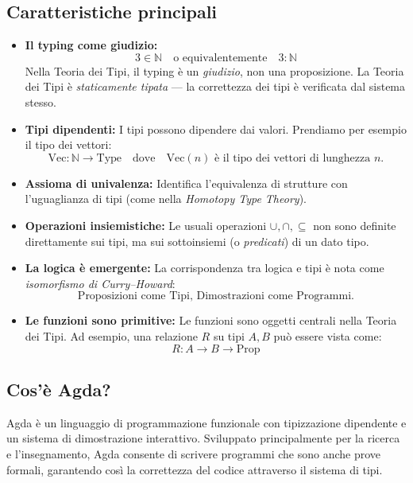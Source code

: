 \documentclass[a4paper]{article}
\theoremstyle{definition}
\theoremstyle{remark}
\begin{document}
\subsection*{Caratteristiche principali}

\begin{itemize}[leftmargin=2em]
  \item \textbf{Il typing come giudizio:}
    \[
      3 \in \mathbb{N} \quad \text{o equivalentemente} \quad 3 : \mathbb{N}
    \]
    Nella Teoria dei Tipi, il typing è un \emph{giudizio}, non una proposizione.  
    La Teoria dei Tipi è \emph{staticamente tipata} — la correttezza dei tipi è verificata dal sistema stesso.

  \item \textbf{Tipi dipendenti:}  
    I tipi possono dipendere dai valori. 
    Prendiamo per esempio il tipo dei vettori:
    \[
      \text{Vec} : \mathbb{N} \to \text{Type} \quad \text{dove} \quad \text{Vec}(n) \text{ è il tipo dei vettori di lunghezza } n.
    \]


  \item \textbf{Assioma di univalenza:}  
    Identifica l’equivalenza di strutture con l’uguaglianza di tipi (come nella \emph{Homotopy Type Theory}).

  \item \textbf{Operazioni insiemistiche:}  
    Le usuali operazioni \(\cup, \cap, \subseteq\) non sono definite direttamente sui tipi,  
    ma sui sottoinsiemi (o \emph{predicati}) di un dato tipo.

  \item \textbf{La logica è emergente:}  
    La corrispondenza tra logica e tipi è nota come \emph{isomorfismo di Curry–Howard}:  
    \[
      \text{Proposizioni come Tipi, Dimostrazioni come Programmi.}
    \]

  \item \textbf{Le funzioni sono primitive:}  
    Le funzioni sono oggetti centrali nella Teoria dei Tipi.  
    Ad esempio, una relazione \( R \) su tipi \( A, B \) può essere vista come:
    \[
      R : A \to B \to \text{Prop}
    \]
\end{itemize}

\subsection{Cos'è Agda?}

Agda è un linguaggio di programmazione funzionale con tipizzazione dipendente
e un sistema di dimostrazione interattivo. 
Sviluppato principalmente per la ricerca e l'insegnamento,
Agda consente di scrivere programmi che sono anche prove formali,
garantendo così la correttezza del codice attraverso il sistema di tipi.
\end{document}

